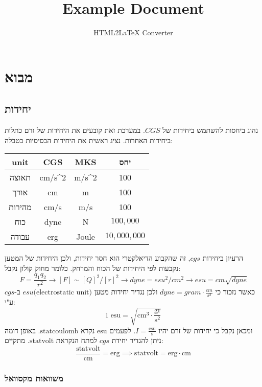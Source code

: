 \documentclass{tstextbook}
\begin{document}
\title{Example Document}
\author{HTML2LaTeX Converter}
\maketitle

\chapter{מבוא}

\section{יחידות}

נהוג ביחסות להשתמש ביחידות של \(CGS\). במערכת זאת קובעים את היחידות של זרם כתלות ביחידות האחרות. נציג ראשית את היחידות הבסיסיות בטבלה:

\begin{table}[htbp]
  \centering
  \begin{tabular}{|cccc|}
    \hline
    unit & CGS & MKS & יחס \\ \hline
    תאוצה & cm/s^2 & m/s^2 & 100 \\ \hline
    אורך & cm & m & 100 \\ \hline
    מהירות & cm/s & m/s & 100 \\ \hline
    כוח & dyne & N & \(100,000\) \\ \hline
    עבודה & erg & Joule & \(10,000,000\) \\ \hline
  \end{tabular}
\end{table}
הרעיון ביחידות \(cgs\), זה שהקבוע הדיאלקטרי הוא חסר יחידות, ולכן היחידות של המטען נקבעות לפי היחידות של הכוח והמרחק. כלומר מחוק קולון נקבל:
$$F={\frac{q_{1}q_{2}}{r^{2}}}\rightarrow[F]\sim[Q]^{2}/[r]^{2}\rightarrow d y n e=e s u^{2}/c m^{2}\rightarrow e s u=c m\sqrt{d y n e}$$
כאשר נזכור כי \(dyne=gram\cdot \frac{cm}{s^2}\) ולכן נגדיר יחידות מטען \(esu\text{(electrostatic unit)}\) ב-\(cgs\) ע"י:
$$1\;\mathrm{esu}=\sqrt{ \mathrm{cm}^3\cdot \mathrm{\frac{gr}{s^2}} }$$
ומכאן נקבל כי יחידות של זרם יהיו \(I=\mathrm{\frac{esu}{s}}\). לפעמים \(\mathrm{esu}\) נקרא \(\mathrm{statcoulomb}\).
באופן דומה ניתן להגדיר יחידת \(cgs\) למתח הנקראת \(\mathrm{statvolt}\). מתקיים:
$$\frac{\mathrm{statvolt}}{\mathrm{cm}}=\mathrm{erg}\implies \mathrm{statvolt=erg\cdot cm}$$

\subsection{משוואות מקסוואל}
\end{document}

